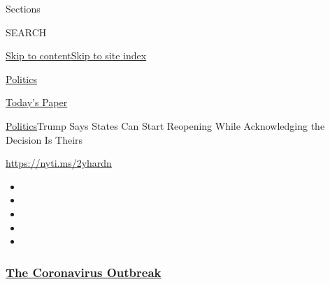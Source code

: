 Sections

SEARCH

\protect\hyperlink{site-content}{Skip to
content}\protect\hyperlink{site-index}{Skip to site index}

\href{https://www.nytimes3xbfgragh.onion/section/politics}{Politics}

\href{https://myaccount.nytimes3xbfgragh.onion/auth/login?response_type=cookie\&client_id=vi}{}

\href{https://www.nytimes3xbfgragh.onion/section/todayspaper}{Today's
Paper}

\href{/section/politics}{Politics}\textbar{}Trump Says States Can Start
Reopening While Acknowledging the Decision Is Theirs

\url{https://nyti.ms/2yhardn}

\begin{itemize}
\item
\item
\item
\item
\item
\end{itemize}

\hypertarget{the-coronavirus-outbreak}{%
\subsubsection{\texorpdfstring{\href{https://www.nytimes3xbfgragh.onion/news-event/coronavirus?name=styln-coronavirus-national\&region=TOP_BANNER\&block=storyline_menu_recirc\&action=click\&pgtype=Article\&impression_id=ef06d1d0-f292-11ea-b230-4985fadaf784\&variant=undefined}{The
Coronavirus
Outbreak}}{The Coronavirus Outbreak}}\label{the-coronavirus-outbreak}}

